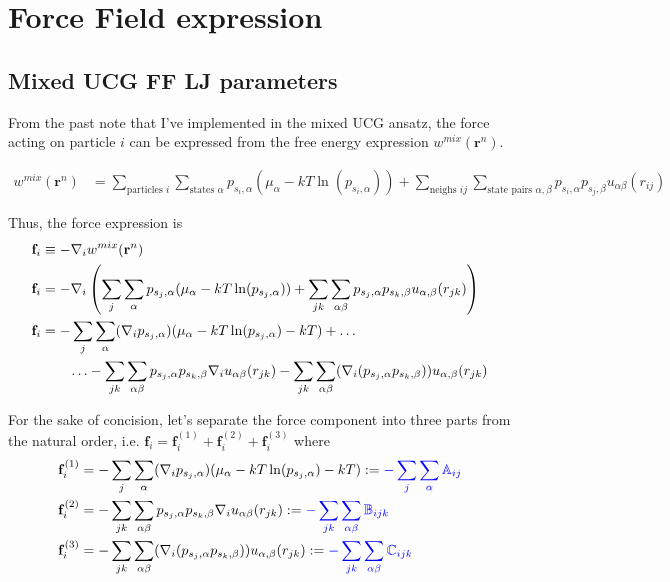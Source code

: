 \documentclass[11pt, oneside]{article}   	%
\begin{document}
\section{Force Field expression}


\subsection{Mixed UCG FF LJ parameters}
From the past note that I've implemented in the mixed UCG ansatz, the force acting on particle $i$ can be expressed from the free energy expression $w^{mix} (\mathbf{r}^n)$. 

\begin{align}
w^{mix}(\mathbf{r}^n) &= \sum_{\text{particles } i} \sum_{\text{states } \alpha} p_{s_i, \alpha} (\mu_{\alpha} - kT \ln(p_{s_i, \alpha})) + \sum_{\text{neighs } ij} \sum_{\text{state pairs } \alpha, \beta} p_{s_i, \alpha} p_{s_j, \beta} u_{\alpha \beta} (r_{ij})
\end{align}

Thus, the force expression is 
\begin{align}
\mathbf{f}_i &\equiv -\nabla_i w^{mix}(\mathbf{r}^n) \\
\mathbf{f}_i & = -\nabla_i \left( \sum_{j} \sum_{\alpha} p_{s_j, \alpha} (\mu_{\alpha} - kT \ln(p_{s_j, \alpha})) + \sum_{jk} \sum_{\alpha \beta} p_{s_j, \alpha} p_{s_k, \beta} u_{\alpha, \beta} (r_{jk}) \right) \\
\mathbf{f}_i & = - \sum_{j} \sum_{\alpha} (\nabla_i p_{s_j, \alpha}) (\mu_{\alpha} - kT \ln(p_{s_j, \alpha}) - kT) + \ldots \\ \notag
& \quad \quad \ldots - \sum_{jk} \sum_{\alpha \beta} p_{s_j, \alpha} p_{s_k, \beta} \nabla_i u_{\alpha \beta} (r_{jk}) - \sum_{jk} \sum_{\alpha \beta} (\nabla_i (p_{s_j, \alpha} p_{s_k, \beta})) u_{\alpha, \beta} (r_{jk})
\end{align}

For the sake of concision, let's separate the force component into three parts from the natural order, i.e. $\mathbf{f}_i = \mathbf{f}^{(1)}_i +\mathbf{f}^{(2)}_i +\mathbf{f}^{(3)}_i $ where
\begin{align}
\mathbf{f}^{(1)}_i &= - \sum_{j} \sum_{\alpha} (\nabla_i p_{s_j, \alpha}) (\mu_{\alpha} - kT \ln(p_{s_j, \alpha}) - kT)  := {\color{blue}- \sum_{j} \sum_{\alpha} \mathbb{A}_{ij}}\\
\mathbf{f}^{(2)}_i &= - \sum_{jk} \sum_{\alpha \beta} p_{s_j, \alpha} p_{s_k, \beta} \nabla_i u_{\alpha \beta} (r_{jk}) := {\color{blue}- \sum_{jk} \sum_{\alpha \beta}  \mathbb{B}_{ijk}} \\
\mathbf{f}^{(3)}_i &= - \sum_{jk} \sum_{\alpha \beta} (\nabla_i (p_{s_j, \alpha} p_{s_k, \beta})) u_{\alpha, \beta} (r_{jk}) := {\color{blue}- \sum_{jk} \sum_{\alpha \beta}  \mathbb{C}_{ijk}}
\end{align}
\end{document}
